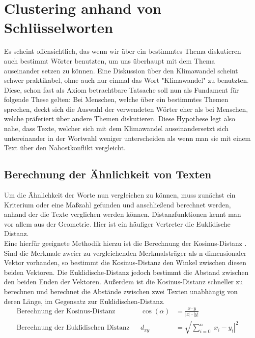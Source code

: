 \chapter{Clustering anhand von Schlüsselworten}
\label{chap:cluster_hashtags}
Es scheint offensichtlich, das wenn wir über ein bestimmtes Thema diskutieren auch bestimmt Wörter benutzten, um uns überhaupt mit dem Thema auseinander setzen zu können. Eine Diskussion über den Klimawandel scheint schwer praktikabel, ohne auch nur einmal das Wort "{}Klimawandel"{} zu benutzten. Diese, schon fast als Axiom betrachtbare Tatsache soll nun als Fundament für folgende These gelten: Bei Menschen, welche über ein bestimmtes Themen sprechen, deckt sich die Auswahl der verwendeten Wörter eher als bei Menschen, welche präferiert über andere Themen diskutieren. Diese Hypothese legt also nahe, dass Texte, welcher sich mit dem Klimawandel auseinandersetzt sich untereinander in der Wortwahl weniger unterscheiden als wenn man sie mit einem Text über den Nahostkonflikt vergleicht.

\section{Berechnung der Ähnlichkeit von Texten}
\label{chap:berechnung_texteahnlichkeit}
Um die Ähnlichkeit der Worte nun vergleichen zu können, muss zunächst ein Kriterium oder eine Maßzahl gefunden und anschließend berechnet werden, anhand der die Texte verglichen werden können. Distanzfunktionen kennt man vor allem aus der Geometrie. Hier ist ein häufiger Vertreter die Euklidische Distanz. \\ \newline
Eine hierfür geeignete Methodik hierzu ist die Berechnung der Kosinus-Distanz . Sind die Merkmale zweier zu vergleichenden Merkmalsträger als n-dimensionaler Vektor vorhanden, so bestimmt die Kosinus-Distanz den Winkel zwischen diesen beiden Vektoren. Die Euklidische-Distanz jedoch  bestimmt die Abstand zwischen den beiden Enden der Vektoren. Außerdem ist die Kosinus-Distanz schneller zu berechnen und berechnet die Abstände zwischen zwei Texten unabhängig von deren Länge, im Gegensatz zur Euklidischen-Distanz.
\begin{equation}
	\begin{aligned} 
		\text{Berechnung der Kosinus-Distanz}&& 
		\cos(\alpha)&=\frac{x\cdot y}{\left|x\right|\cdot \left|y\right|} \\
		\text{Berechnung der Euklidischen Distanz}&& 
		{d}_{xy}&=\sqrt{\sum _{i=0}^{n}{\left|{x}_{i}-{y}_{i}\right|}^{2}} \\  
	\end{aligned} 
	\label{eq:distance}
\end{equation}

